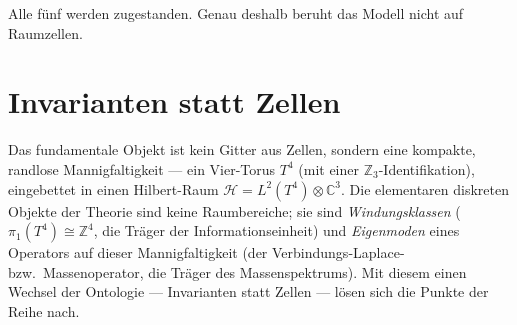 Alle fünf werden zugestanden. Genau deshalb beruht das Modell nicht auf Raumzellen.

\section{Invarianten statt Zellen}

Das fundamentale Objekt ist kein Gitter aus Zellen, sondern eine kompakte, randlose
Mannigfaltigkeit --- ein Vier-Torus $T^4$ (mit einer $\mathbb{Z}_3$-Identifikation),
eingebettet in einen Hilbert-Raum $\mathcal{H}=L^2(T^4)\otimes\mathbb{C}^3$. Die
elementaren diskreten Objekte der Theorie sind keine Raumbereiche; sie sind
\emph{Windungsklassen} ($\pi_1(T^4)\cong\mathbb{Z}^4$, die Träger der
Informationseinheit) und \emph{Eigenmoden} eines Operators auf dieser Mannigfaltigkeit
(der Verbindungs-Laplace- bzw.\ Massenoperator, die Träger des Massenspektrums). Mit
diesem einen Wechsel der Ontologie --- Invarianten statt Zellen --- lösen sich die
Punkte der Reihe nach.

